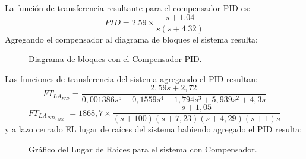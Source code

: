 \documentclass[a4paper,11pt]{article}
\begin{document}
La función de transferencia resultante para el compensador PID es:
$$PID=2.59\times\frac{s+1.04}{s(s+4.32)}$$
Agregando el compensador al diagrama de bloques el sistema resulta:\\

  \begin{figure}[H] %
	\caption{Diagrama de bloques con el Compensador PID.}
	\label{fig:diagrama}
	\end{figure} 
	
Las funciones de transferencia del sistema agregando el PID resultan:
$$FT_{LA_{PID}}=\frac{2,59s+2,72}{0,001386s^5+0,1559s^4+1,794s^3+5,939s^2+4,3s}$$
$$FT_{LA_{PID_{(ZPK)}}}=1868,7\times\frac{s+1,05}{(s+100)(s+7,23)(s+4,29)(s+1)s}$$
y a lazo cerrado
EL lugar de raíces del sistema habiendo agregado el PID resulta:

  \begin{figure}[H] %
	\caption{Gráfico del Lugar de Raices para el sistema con Compensador.}
	\label{fig:LR_comp_1}
	\end{figure} 
	
\end{document}
